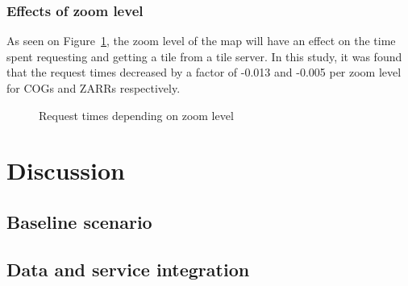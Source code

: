 \documentclass[
  oneside,
  open=any]{scrbook}
\begin{document}
\subsection{Effects of zoom level}\label{effects-of-zoom-level}

As seen on Figure~\ref{fig-comp-zoom}, the zoom level of the map will
have an effect on the time spent requesting and getting a tile from a
tile server. In this study, it was found that the request times
decreased by a factor of -0.013 and -0.005 per zoom level for COGs and
ZARRs respectively.

\begin{figure}[H]


\caption{\label{fig-comp-zoom}Request times depending on zoom level}

\end{figure}%

\chapter{Discussion}\label{discussion}

\section{Baseline scenario}\label{baseline-scenario-1}

\section{Data and service
integration}\label{data-and-service-integration-1}
\end{document}
